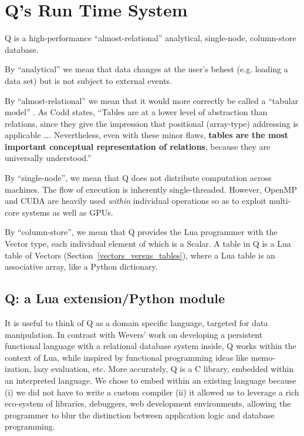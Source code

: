 \section{Q's Run Time System}

Q is a high-performance ``almost-relational'' 
analytical, single-node, column-store database. 
\be
\item 
By ``analytical'' we mean that data changes at the user's behest (e.g.
loading a data set) but is not subject to external events.
\item 
By ``almost-relational'' we mean that it would more correctly
be called a ``tabular model'' \cite{Codd1982}. As Codd states, ``Tables are
at a lower level of abstraction than relations, since they give
the impression that positional (array-type) addressing is applicable
\ldots. Nevertheless, even with these minor flaws,
{\bf tables are the most important conceptual representation of
relations}, because they are universally understood.''
\item By ``single-node'', we mean that Q does not distribute computation across
  machines. The flow of execution is inherently single-threaded. However,
  OpenMP and CUDA are heavily used {\em within} individual operations so as
  to exploit multi-core systems as well as GPUs.
\item By ``column-store'', we mean that 
Q provides the Lua programmer with the Vector type, each
individual element of which is a Scalar. A table in Q is a Lua
table of Vectors (Section~\ref{vectors_versus_tables}), where a Lua table is an
associative array, like a Python dictionary.

\ee

\subsection{Q: a Lua extension/Python module}


It is useful to think of Q as a domain specific language, targeted for data
manipulation. In contrast with Wevers' work \cite{Wevers2014} on
developing a persistent functional language with
a relational database system inside, Q works within the context of Lua, while
inspired by functional programming ideas like memo-ization, lazy evaluation,
etc.
More accurately, Q is a C library, embedded within an interpreted
language.
We chose to embed within an existing language because (i) we did not have to
write a custom compiler (ii) it allowed us to leverage a rich eco-system of
libraries, debuggers, web development environments, allowing the programmer to
blur the distinction between application logic and database programming.

